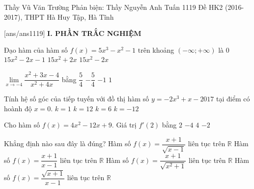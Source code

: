 \begin{name}
{Thầy Vũ Văn Trường \newline Phản biện: Thầy Nguyễn Anh Tuấn}
{1119 Đề HK2 (2016-2017), THPT Hà Huy Tập, Hà Tĩnh}%
\end{name}
\setcounter{ex}{0}\setcounter{bt}{0}
[ans/ans1119]
\noindent\textbf{I. PHẦN TRẮC NGHIỆM}
\begin{ex}%
Đạo hàm của hàm số $f(x)=5x^3-x^2-1$ trên khoảng $(-\infty;+\infty)$ là
\choice
{$0$}
{$15x^2-2x-1$}
{$15x^2+2x$}
{\True $15x^2-2x$}
\end{ex}

\begin{ex}%
$\lim\limits_{x\to -4}\dfrac{x^2+3x-4}{x^2+4x}$ bằng
\choice
{\True $\dfrac{5}{4}$}
{$-\dfrac{5}{4}$}
{$-1$}
{$1$}
\end{ex}
\begin{ex}%
Tính hệ số góc của tiếp tuyến với đồ thị hàm số $y=-2x^3+x-2017$ tại điểm có hoành độ $x=0$.
\choice
{\True $k=1$}
{$k=12$}
{$k=6$}
{$k=-12$}
\end{ex}
\begin{ex}%
Cho hàm số $f(x)=4x^2-12x+9$. Giá trị $f'(2)$ bằng
\choice
{$2$}
{$-4$}
{\True $4$}
{$-2$}
\end{ex}
\begin{ex}%
Khẳng định nào sau đây là đúng?
\choice
{Hàm số $f(x)=\dfrac{x+1}{\sqrt{x-1}}$ liên tục trên $\mathbb{R}$}
{Hàm số $f(x)=\dfrac{x+1}{x-1}$ liên tục trên $\mathbb{R}$}
{\True Hàm số $f(x)=\dfrac{x+1}{\sqrt{x^2+1}}$ liên tục trên $\mathbb{R}$}
{Hàm số $f(x)=\dfrac{\sqrt{x+1}}{x-1}$ liên tục trên $\mathbb{R}$}
\end{ex}
